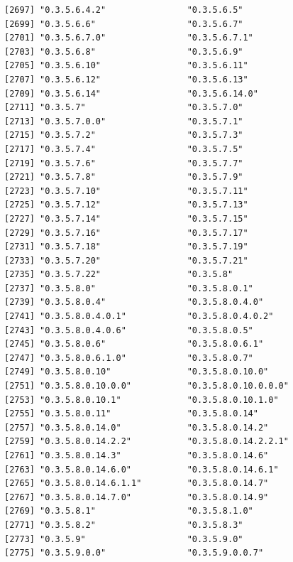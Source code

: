 \documentclass[
  letterpaper,
  DIV=11,
  numbers=noendperiod]{scrreprt}
\begin{document}
\begin{verbatim}
[2697] "0.3.5.6.4.2"                "0.3.5.6.5"                 
[2699] "0.3.5.6.6"                  "0.3.5.6.7"                 
[2701] "0.3.5.6.7.0"                "0.3.5.6.7.1"               
[2703] "0.3.5.6.8"                  "0.3.5.6.9"                 
[2705] "0.3.5.6.10"                 "0.3.5.6.11"                
[2707] "0.3.5.6.12"                 "0.3.5.6.13"                
[2709] "0.3.5.6.14"                 "0.3.5.6.14.0"              
[2711] "0.3.5.7"                    "0.3.5.7.0"                 
[2713] "0.3.5.7.0.0"                "0.3.5.7.1"                 
[2715] "0.3.5.7.2"                  "0.3.5.7.3"                 
[2717] "0.3.5.7.4"                  "0.3.5.7.5"                 
[2719] "0.3.5.7.6"                  "0.3.5.7.7"                 
[2721] "0.3.5.7.8"                  "0.3.5.7.9"                 
[2723] "0.3.5.7.10"                 "0.3.5.7.11"                
[2725] "0.3.5.7.12"                 "0.3.5.7.13"                
[2727] "0.3.5.7.14"                 "0.3.5.7.15"                
[2729] "0.3.5.7.16"                 "0.3.5.7.17"                
[2731] "0.3.5.7.18"                 "0.3.5.7.19"                
[2733] "0.3.5.7.20"                 "0.3.5.7.21"                
[2735] "0.3.5.7.22"                 "0.3.5.8"                   
[2737] "0.3.5.8.0"                  "0.3.5.8.0.1"               
[2739] "0.3.5.8.0.4"                "0.3.5.8.0.4.0"             
[2741] "0.3.5.8.0.4.0.1"            "0.3.5.8.0.4.0.2"           
[2743] "0.3.5.8.0.4.0.6"            "0.3.5.8.0.5"               
[2745] "0.3.5.8.0.6"                "0.3.5.8.0.6.1"             
[2747] "0.3.5.8.0.6.1.0"            "0.3.5.8.0.7"               
[2749] "0.3.5.8.0.10"               "0.3.5.8.0.10.0"            
[2751] "0.3.5.8.0.10.0.0"           "0.3.5.8.0.10.0.0.0"        
[2753] "0.3.5.8.0.10.1"             "0.3.5.8.0.10.1.0"          
[2755] "0.3.5.8.0.11"               "0.3.5.8.0.14"              
[2757] "0.3.5.8.0.14.0"             "0.3.5.8.0.14.2"            
[2759] "0.3.5.8.0.14.2.2"           "0.3.5.8.0.14.2.2.1"        
[2761] "0.3.5.8.0.14.3"             "0.3.5.8.0.14.6"            
[2763] "0.3.5.8.0.14.6.0"           "0.3.5.8.0.14.6.1"          
[2765] "0.3.5.8.0.14.6.1.1"         "0.3.5.8.0.14.7"            
[2767] "0.3.5.8.0.14.7.0"           "0.3.5.8.0.14.9"            
[2769] "0.3.5.8.1"                  "0.3.5.8.1.0"               
[2771] "0.3.5.8.2"                  "0.3.5.8.3"                 
[2773] "0.3.5.9"                    "0.3.5.9.0"                 
[2775] "0.3.5.9.0.0"                "0.3.5.9.0.0.7"             

\end{verbatim}
\end{document}
